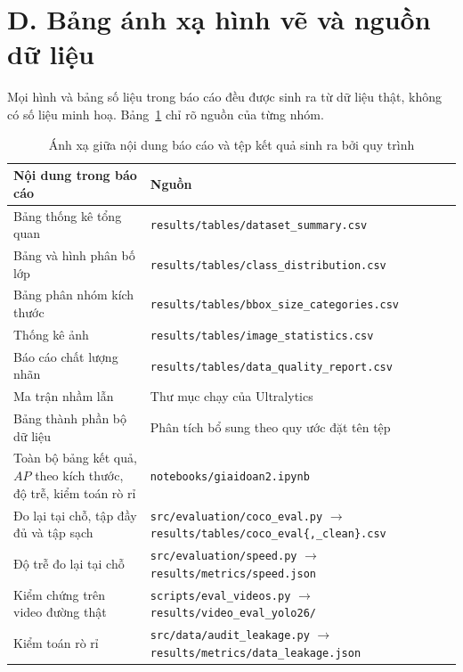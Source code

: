 \section*{D. Bảng ánh xạ hình vẽ và nguồn dữ liệu}

Mọi hình và bảng số liệu trong báo cáo đều được sinh ra từ dữ liệu thật, không có số liệu minh
hoạ. Bảng~\ref{tab:anhxa} chỉ rõ nguồn của từng nhóm.

\begin{table}[H]
\centering
\caption{Ánh xạ giữa nội dung báo cáo và tệp kết quả sinh ra bởi quy trình}
\label{tab:anhxa}
\small
\begin{tabular}{p{5.6cm} p{7.9cm}}
\toprule
\textbf{Nội dung trong báo cáo} & \textbf{Nguồn} \\
\midrule
Bảng thống kê tổng quan     & \texttt{results/tables/dataset\_summary.csv} \\
Bảng và hình phân bố lớp    & \texttt{results/tables/class\_distribution.csv} \\
Bảng phân nhóm kích thước   & \texttt{results/tables/bbox\_size\_categories.csv} \\
Thống kê ảnh                & \texttt{results/tables/image\_statistics.csv} \\
Báo cáo chất lượng nhãn     & \texttt{results/tables/data\_quality\_report.csv} \\
Ma trận nhầm lẫn            & Thư mục chạy của Ultralytics \\
Bảng thành phần bộ dữ liệu  & Phân tích bổ sung theo quy ước đặt tên tệp \\
Toàn bộ bảng kết quả, $AP$ theo kích thước, độ trễ, kiểm toán rò rỉ & \texttt{notebooks/giaidoan2.ipynb} \\
Đo lại tại chỗ, tập đầy đủ và tập sạch & \texttt{src/evaluation/coco\_eval.py} $\rightarrow$ \texttt{results/tables/coco\_eval\{,\_clean\}.csv} \\
Độ trễ đo lại tại chỗ & \texttt{src/evaluation/speed.py} $\rightarrow$ \texttt{results/metrics/speed.json} \\
Kiểm chứng trên video đường thật & \texttt{scripts/eval\_videos.py} $\rightarrow$ \texttt{results/video\_eval\_yolo26/} \\
Kiểm toán rò rỉ & \texttt{src/data/audit\_leakage.py} $\rightarrow$ \texttt{results/metrics/data\_leakage.json} \\
\bottomrule
\end{tabular}
\end{table}

